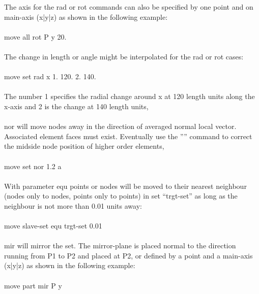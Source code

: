 \documentclass{article}
\begin{document}
The axis for the rad or rot commands can also be specified by one point and on main-axis (x|y|z) as shown in the following example:\\\\
move all rot P y 20.\\\\
The change in length or angle might be interpolated for the rad or rot cases:\\\\
move set rad x 1. 120. 2. 140.\\\\
The number 1 specifies the radial change around x at 120 length units along the x-axis and 2 is the change at 140 length units,\\\\
nor will move nodes away in the direction of averaged normal local vector. Associated element faces must exist. Eventually use the '''' command to correct the midside node position of higher order elements,\\\\
move set nor 1.2 a\\\\
With parameter equ points or nodes will be moved to their nearest neighbour (nodes only to nodes, points only to points) in set ``trgt-set'' as long as the neighbour is not more than 0.01 units away:\\\\
move slave-set equ trgt-set 0.01\\\\
mir will mirror the set. The mirror-plane is placed normal to the direction running from P1 to P2 and placed at P2, or defined by a point and a main-axis (x|y|z) as shown in the following example:\\\\
move part mir P y
\end{document}

